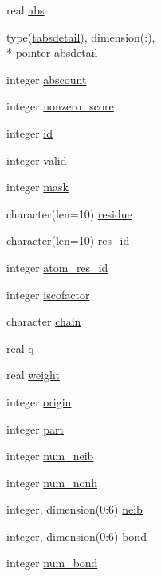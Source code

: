 \begin{DoxyCompactItemize}
real \hyperlink{structcalc__pmf_1_1tpmfatom_a7034f363b669e7743e2bb97283c01798}{abs}
\item 
type(\hyperlink{structcalc__pmf_1_1tabsdetail}{tabsdetail}), dimension(\-:), \\*
pointer \hyperlink{structcalc__pmf_1_1tpmfatom_a65f3001e133e4e49fda5b8dcfc9a1ad5}{absdetail}
\item 
integer \hyperlink{structcalc__pmf_1_1tpmfatom_a4c2c28155882e14eec01d95ee508d283}{abscount}
\item 
integer \hyperlink{structcalc__pmf_1_1tpmfatom_a50d3e7b86d60f104ae699c185eb788c4}{nonzero\-\_\-score}
\item 
integer \hyperlink{structcalc__pmf_1_1tpmfatom_a50bf3f3401a1c72f242e31f5a2aa8a79}{id}
\item 
integer \hyperlink{structcalc__pmf_1_1tpmfatom_af664ece20811640fdc7f28e778ac18cc}{valid}
\item 
integer \hyperlink{structcalc__pmf_1_1tpmfatom_a02749a0a7a39bf581565b018bebc594c}{mask}
\item 
character(len=10) \hyperlink{structcalc__pmf_1_1tpmfatom_a9c411416e0292451c2f1f054e9c2fc11}{residue}
\item 
character(len=10) \hyperlink{structcalc__pmf_1_1tpmfatom_a2da7425945e4de6764f45007898debd4}{res\-\_\-id}
\item 
integer \hyperlink{structcalc__pmf_1_1tpmfatom_a0a324d62ed3dcb36e29212bd8d68d9fe}{atom\-\_\-res\-\_\-id}
\item 
integer \hyperlink{structcalc__pmf_1_1tpmfatom_a4d2d0a56e862d7d38b6692d10dfe22e3}{iscofactor}
\item 
character \hyperlink{structcalc__pmf_1_1tpmfatom_a54cc738bc9fd3d938d83848a6959ffec}{chain}
\item 
real \hyperlink{structcalc__pmf_1_1tpmfatom_a9279c0da2af81933064cc8729970d345}{q}
\item 
real \hyperlink{structcalc__pmf_1_1tpmfatom_ab27405c362eae2c791b866606a0f77b0}{weight}
\item 
integer \hyperlink{structcalc__pmf_1_1tpmfatom_a45c50754e189caa6a9dd56a4d6fefcb8}{origin}
\item 
integer \hyperlink{structcalc__pmf_1_1tpmfatom_a7388399d3ececa37f625deaa2d52d95a}{part}
\item 
integer \hyperlink{structcalc__pmf_1_1tpmfatom_a55e78d534775f80cc187100dea08896c}{num\-\_\-neib}
\item 
integer \hyperlink{structcalc__pmf_1_1tpmfatom_aeb93eb937add59340623657d0b2a1add}{num\-\_\-nonh}
\item 
integer, dimension(0\-:6) \hyperlink{structcalc__pmf_1_1tpmfatom_a70f619b9bacfc8819d85376382dc845a}{neib}
\item 
integer, dimension(0\-:6) \hyperlink{structcalc__pmf_1_1tpmfatom_a0dae5e79b033be6969f2ccd66489456e}{bond}
\item 
integer \hyperlink{structcalc__pmf_1_1tpmfatom_aad206cabd283117e24c0f6e172120c08}{num\-\_\-bond}
\end{DoxyCompactItemize}


